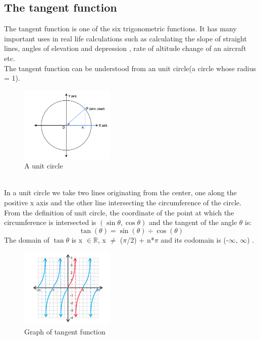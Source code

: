 \documentclass[12pt]{article}
\begin{document}
\subsection{The tangent function}
    The tangent function is one of the six trigonometric functions. It has many important uses in real life calculations such as calculating the slope of straight lines, angles of elevation and depression \cite{tanexamplewebsite1}, rate of altitude change of an aircraft \cite{tanexamplewebsite2} etc. \\
    The tangent function can be understood from an unit circle(a circle whose radius = 1).
    \begin{figure} [!h]
        \centering
        \includegraphics[width=0.4\textwidth]{Unit-circle.png}
        \caption{A unit circle}
        \label{fig:unit_circle}
    \end{figure} \\
    In a unit circle we take two lines originating from the center, one along the positive x axis and the other line intersecting the circumference of the circle. From the definition of unit circle, the coordinate of the point at which the circumference is intersected is $(\sin\theta, \cos\theta)$ \cite{unitcirclewebsite} and the tangent of the angle $\theta$ is:
    \begin{equation}
        \tan(\theta) = \sin(\theta) \div \cos(\theta) \label{tan_formula_1}
    \end{equation}
    The domain of $\tan \theta$ is x $\in \mathbb{R}$, x $\ne$ ($\pi$/2) + n*$\pi$ and its codomain is (-$\infty$, $\infty$) \cite{tandomainwebsite}.
    \begin{figure} [H]
        \centering
        \includegraphics[width=0.4\textwidth]{graph-of-tangent.png}
        \caption{Graph of tangent function}
        \label{fig:graph_tangent}
    \end{figure} 
\end{document}
